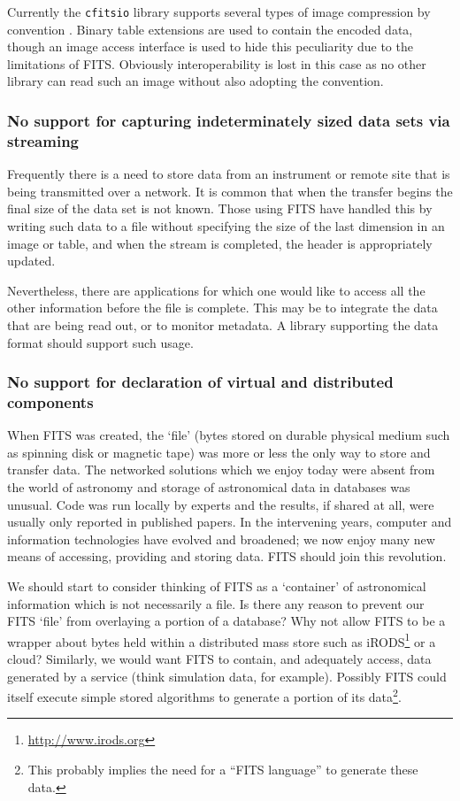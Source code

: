 \documentclass[final,authoryear,5p,times,twocolumn]{elsarticle}
\begin{document}
Currently the \texttt{cfitsio} library supports several types of image
compression by convention \citep[see
e.g.][\href{http://ascl.net/1010.002}{ascl:1010.002}]{2000ASPC..216..551P,2007ASPC..376..483S,2009PASP..121..414P}.
Binary table extensions are used to contain the encoded data, though an
image access interface is used to hide this peculiarity due to the
limitations of FITS. Obviously interoperability is lost in this case as
no other library can read such an image without also adopting the
convention.

\subsubsection{No support for capturing indeterminately sized data sets via streaming}


Frequently there is a need to store data from an instrument or remote
site that is being transmitted over a network. It is common that when
the transfer begins the final size of the data set is not known. Those
using FITS have handled this by writing such data to a file without
specifying the size of the last dimension in an image or table, and
when the stream is completed, the header is appropriately updated.


Nevertheless, there are applications for which one would like to
access all the other information before the file is complete. This may
be to integrate the data that are being read out, or to monitor
metadata. A library supporting the data format should support such
usage.


\subsubsection{No support for declaration of virtual and distributed components}


When FITS was created, the `file' (bytes stored on durable physical
medium such as spinning disk or magnetic tape) was more or less the
only way to store and transfer data. The networked solutions which we
enjoy today were absent from the world of astronomy and storage of
astronomical data in databases was unusual. Code was run locally by
experts and the results, if shared at all, were usually only reported
in published papers. In the intervening years, computer and
information technologies have evolved and broadened; we now enjoy many
new means of accessing, providing and storing data. FITS should join
this revolution.


We should start to consider thinking of FITS as a `container' of
astronomical information which is not necessarily a file. Is there
any reason to prevent our FITS `file' from overlaying a portion of a
database? Why not allow FITS to be a wrapper about bytes held within a
distributed mass store such as
iRODS\footnote{\url{http://www.irods.org}} \citep[see e.g.][]{2007AGUFMIN13B1214R}
or a cloud? Similarly, we would
want FITS to contain, and adequately access, data generated by a
service (think simulation data, for example). Possibly FITS could
itself execute simple stored algorithms to generate a portion of its
data\footnote{This probably implies the need for a ``FITS language'' to generate these data.}.
\end{document}
